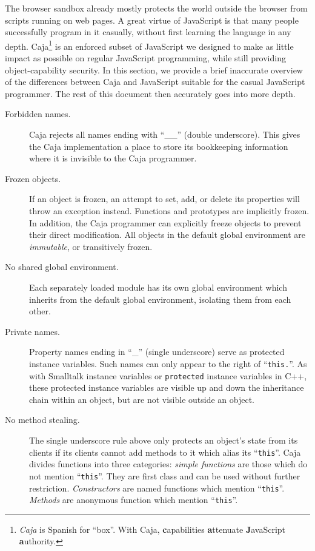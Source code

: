 \documentclass[letterpaper,twocolumn,10pt]{article}
\newcommand{\code}[1]{{\tt {#1}}}              %
\begin{document}
The browser sandbox already mostly protects the world outside the browser 
from scripts running on web pages. A great virtue of JavaScript is that many 
people successfully program in it casually, without first learning the 
language in any depth. Caja\footnote{
%
\emph{Caja} is Spanish for ``box''. With Caja, \textbf{c}apabilities 
\textbf{a}ttenuate \textbf{J}avaScript \textbf{a}uthority.
%
} is an enforced subset of JavaScript we designed to make as little impact as 
possible on regular JavaScript programming, while still providing 
object-capability security. In this section, we provide a brief inaccurate 
overview of the differences between Caja and JavaScript suitable for the 
casual JavaScript programmer. The rest of this document then accurately goes 
into more depth.

\begin{description}

  \item[Forbidden names.] Caja rejects all names ending with ``\_\_'' (double 
  underscore). This gives the Caja implementation a place to store its 
  bookkeeping information where it is invisible to the Caja programmer.
 
  \item[Frozen objects.] If an object is frozen, an attempt to set, add, or 
  delete its properties will throw an exception instead. Functions and 
  prototypes are implicitly frozen. In addition, the Caja programmer can 
  explicitly freeze objects to prevent their direct modification. All objects 
  in the default global environment are \emph{immutable}, or transitively 
  frozen.
 
  \item[No shared global environment.] Each separately loaded module has its 
  own global environment which inherits from the default global environment, 
  isolating them from each other.

  \item[Private names.] Property names ending in ``\_'' (single underscore) 
  serve as protected instance variables. Such names can only appear to the 
  right of ``\code{this.}''. As with Smalltalk instance variables or 
  \code{protected} instance variables in C++, these protected instance 
  variables are visible up and down the inheritance chain within an object, 
  but are not visible outside an object.
 
  \item[No method stealing.] The single underscore rule above only protects 
  an object's state from its clients if its clients cannot add methods to it 
  which alias its ``\code{this}''. Caja divides functions into three 
  categories: \emph{simple functions} are those which do not mention 
  ``\code{this}''. They are first class and can be used without further 
  restriction. \emph{Constructors} are named functions which mention 
  ``\code{this}''. \emph{Methods} are anonymous function which mention 
  ``\code{this}''.


\end{description}
\end{document}
